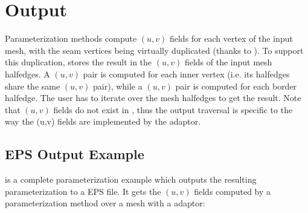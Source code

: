 \section{Output}

Parameterization methods compute $(u,v)$ fields for each vertex
of the input mesh, with the seam vertices being virtually duplicated (thanks
to ).
To support this duplication,
 stores
the result in the $(u,v)$ fields of the input mesh halfedges.
A $(u,v)$ pair is computed for
each inner vertex (i.e. its halfedges share the same $(u,v)$ pair),
while a $(u,v)$ pair is computed for each border halfedge.
The user has to iterate over the mesh halfedges to get the result.
Note that $(u,v)$ fields do not exist in ,
thus the output traversal is specific to the way the (u,v) fields are implemented by the adaptor.

\subsection{EPS Output Example}

 is a complete parameterization
example which outputs the resulting parameterization to a EPS file. It gets the $(u,v)$ fields computed by a parameterization method over a  mesh with a
 adaptor:


